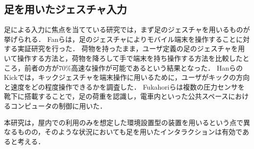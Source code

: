\documentclass[submit, techrep]{ipsj}
\begin{document}
\subsection{足を用いたジェスチャ入力}
足による入力に焦点を当てている研究では，まず足のジェスチャを用いるものが挙げられる．
Fanら\cite{Fan:2017:ESF:3123021.3123043}は，足のジェスチャによりモバイル端末を操作することに対する実証研究を行った．
荷物を持ったまま，ユーザ定義の足のジェスチャを用いて操作する方法と，荷物を降ろして手で端末を持ち操作する方法を比較したところ，前者の方が70\%高速な操作が可能であるという結果となった．
HanらのKick\cite{Han:2011:KIU:2037373.2037379}では，キックジェスチャを端末操作に用いるために，ユーザがキックの方向と速度をどの程度操作できるかを調査した．
Fukahoriら\cite{Fukahori:2015:ESF:2702123.2702308}は複数の圧力センサを靴下に搭載することで，足の荷重を認識し，電車内といった公共スペースにおけるコンピュータの制御に用いた．\par

本研究は，屋内での利用のみを想定した環境設置型の装置を用いるという点で異なるものの，そのような状況においても足を用いたインタラクションは有効であると考える．
\end{document}
